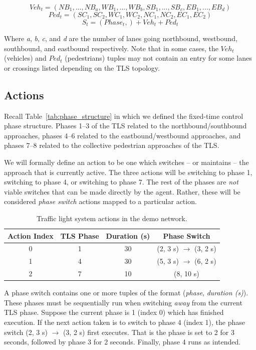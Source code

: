 \documentclass[a4paper]{report}
\begin{document}
\[
  Veh_t = (NB_1, ..., NB_a, WB_1, ..., WB_b, SB_1, ..., SB_c, EB_1, ..., EB_d)
\]
\[
  Ped_t = (SC_1, SC_2, WC_1, WC_2, NC_1, NC_2, EC_1, EC_2)
\]
\begin{equation}
  \label{state_formula}
  S_t = (Phase_t,) + Veh_t + Ped_t
\end{equation}

Where \emph{a}, \emph{b}, \emph{c}, and \emph{d} are the number of lanes going northbound, westbound, southbound, and eastbound respectively. Note that in some cases, the $Veh_t$ (vehicles) and $Ped_t$ (pedestrians) tuples may not contain an entry for some lanes or crossings listed depending on the TLS topology.

\subsection{Actions}

Recall Table~\ref{tab:phase_structure} in which we defined the fixed-time control phase structure. Phases 1--3 of the TLS related to the northbound/southbound approaches, phases 4--6 related to the eastbound/westbound approaches, and phases 7--8 related to the collective pedestrian approaches of the TLS.

We will formally define an action to be one which switches -- or maintains -- the approach that is currently active. The three actions will be switching to phase 1, switching to phase 4, or switching to phase 7. The rest of the phases are \emph{not} viable switches that can be made directly by the agent. Rather, these will be considered \emph{phase switch} actions mapped to a particular action.

\begin{table}[H]
  \centering
  \begin{tabular}{c c c c}
    \hline
    \textbf{Action Index} & \textbf{TLS Phase} & \textbf{Duration (s)} & \textbf{Phase Switch} \\
    \hline
    0 & 1 & 30 & (2, 3 s) $\to$ (3, 2 s) \\
    \hline
    1 & 4 & 30 & (5, 3 s) $\to$ (6, 2 s) \\
    \hline
    2 & 7 & 10 & (8, 10 s) \\
    \hline
  \end{tabular}
  \caption{Traffic light system actions in the demo network.}
  \label{tab:phase_actions}
\end{table}

A phase switch contains one or more tuples of the format (\emph{phase}, \emph{duration (s)}). These phases must be sequentially run when switching \emph{away} from the current TLS phase. Suppose the current phase is 1 (index 0) which has finished execution. If the next action taken is to switch to phase 4 (index 1), the phase switch (2, 3 s) $\to$ (3, 2 s) first executes. That is the phase is set to 2 for 3 seconds, followed by phase 3 for 2 seconds. Finally, phase 4 runs as intended.
\end{document}

